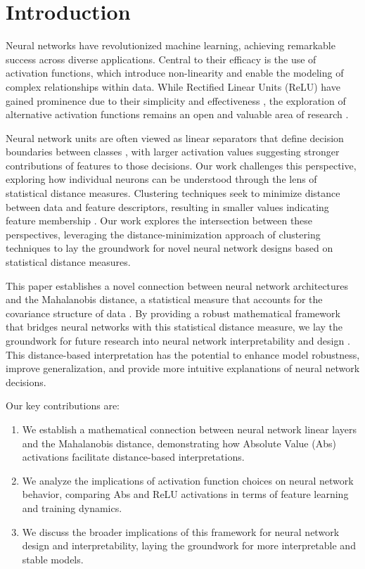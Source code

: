 \section{Introduction}

Neural networks have revolutionized machine learning, achieving remarkable success across diverse applications. Central to their efficacy is the use of activation functions, which introduce non-linearity and enable the modeling of complex relationships within data. While Rectified Linear Units (ReLU) have gained prominence due to their simplicity and effectiveness \citep{nair2010rectified}, the exploration of alternative activation functions remains an open and valuable area of research \citep{ramachandran2017searching}.

Neural network units are often viewed as linear separators that define decision boundaries between classes \citep{minsky1969perceptrons}, with larger activation values suggesting stronger contributions of features to those decisions. Our work challenges this perspective, exploring how individual neurons can be understood through the lens of statistical distance measures. Clustering techniques seek to minimize distance between data and feature descriptors, resulting in smaller values indicating feature membership \citep{macqueen1967methods}. Our work explores the intersection between these perspectives, leveraging the distance-minimization approach of clustering techniques to lay the groundwork for novel neural network designs based on statistical distance measures.

This paper establishes a novel connection between neural network architectures and the Mahalanobis distance, a statistical measure that accounts for the covariance structure of data \citep{mahalanobis1936generalized}. By providing a robust mathematical framework that bridges neural networks with this statistical distance measure, we lay the groundwork for future research into neural network interpretability and design \citep{lipton2016mythos}. This distance-based interpretation has the potential to enhance model robustness, improve generalization, and provide more intuitive explanations of neural network decisions.

Our key contributions are:

\begin{enumerate}
    \item We establish a mathematical connection between neural network linear layers and the Mahalanobis distance, demonstrating how Absolute Value (Abs) activations facilitate distance-based interpretations.
    \item We analyze the implications of activation function choices on neural network behavior, comparing Abs and ReLU activations in terms of feature learning and training dynamics.
    \item We discuss the broader implications of this framework for neural network design and interpretability, laying the groundwork for more interpretable and stable models.
\end{enumerate}
